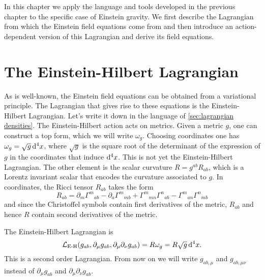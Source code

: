 \documentclass[../main.tex]{subfiles}
\begin{document}
In this chapter we apply the language and tools developed in the previous chapter to the
specific case of Einstein gravity. We first describe the Lagrangian from which the Einstein
field equations come from and then introduce an action-dependent version of this Lagrangian and
derive its field equations. 

\section{The Einstein-Hilbert Lagrangian}
As is well-known, the Einstein field equations can be obtained from a variational
principle. The Lagrangian that gives rise to these equations is the Einstein-Hilbert
Lagrangian. Let's write it down in the language of \cref{sec:lagrangian densities}. The
Einstein-Hilbert action acts on metrics. Given a metric \( g \), one can construct a
top form, which we will write \( \omega_g \). Choosing coordinates one has \( \omega_g =
\sqrt{g} \,\mathrm{d}^4 x \), where \( \sqrt{g} \) is the square root of the determinant of the
expression of \( g \) in the coordinates that induce \( \mathrm{d}^4 x \). This is not yet the
Einstein-Hilbert Lagrangian. The other element is the scalar curvature \( R = g^{ab}R_{ab}
\), which is a Lorentz invariant scalar that encodes the curvature associated to \( g \).
In coordinates, the Ricci tensor \( R_{ab} \) takes the form
\begin{equation} \label{eq:ricci tensor}
	R_{ab} = \partial_m{\Gamma^m}_{ab} - \partial_a {\Gamma^m}_{mb} + {\Gamma^m}_{mn}
	{\Gamma^n}_{ab} - {\Gamma^m}_{an}{\Gamma^n}_{mb}
\end{equation}
and since the Christoffel symbols contain first derivatives of the metric, \( R_{ab} \) and
hence \( R \) contain second derivatives of the metric. 

The Einstein-Hilbert Lagrangian is
\begin{equation}\label{eq:EH lagrangian}
	\mathcal{L}_{\text{E-H}}(g_{ab}, \partial_\mu g_{ab}, \partial_\mu \partial_\nu g_{ab}) =
	R\omega_g = R \sqrt{g}\,\mathrm{d}^4 x.
\end{equation}
This is a second order Lagrangian. From now on we will write \( g_{ab,\mu} \) and \(
g_{ab,\mu\nu} \) instead of \( \partial_\mu g_{ab} \) and \( \partial_\mu\partial_\nu
g_{ab} \). 
\end{document}

